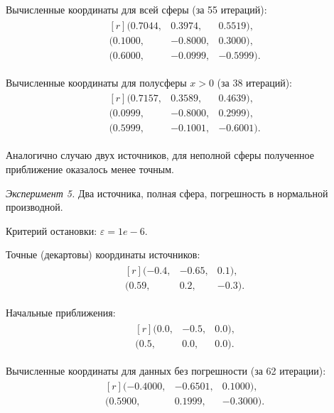 Вычисленные координаты для всей сферы (за 55 итераций):
\begin{align*}
    \begin{matrix*}[r]
    (0.7044, & 0.3974, & 0.5519) \text{,}\\
    (0.1000, & -0.8000, & 0.3000) \text{,}\\
    (0.6000, & -0.0999, & -0.5999) \text{.}
    \end{matrix*}
\end{align*}

Вычисленные координаты для полусферы $x > 0$ (за 38 итераций):
\begin{align*}
    \begin{matrix*}[r]
    (0.7157, & 0.3589, & 0.4639) \text{,}\\
    (0.0999, & -0.8000, & 0.2999) \text{,}\\
    (0.5999, & -0.1001, & -0.6001) \text{.}
    \end{matrix*}
\end{align*}

Аналогично случаю двух источников, для неполной сферы полученное приближение оказалось менее точным.

\emph{Эксперимент 5.} Два источника, полная сфера, погрешность в нормальной производной.

Критерий остановки: $\varepsilon = 1e-6$.

Точные (декартовы) координаты источников:
\begin{align*}
    \begin{matrix*}[r]
(-0.4, & -0.65, & 0.1) \text{,}\\
(0.59, & 0.2, & -0.3) \text{.}
    \end{matrix*}
\end{align*}

Начальные приближения:
\begin{align*}
    \begin{matrix*}[r]
(0.0, & -0.5, & 0.0) \text{,}\\
(0.5, & 0.0, & 0.0) \text{.}
    \end{matrix*}
\end{align*}

Вычисленные координаты для данных без погрешности (за 62 итерации):
\begin{align*}
    \begin{matrix*}[r]
(-0.4000, & -0.6501, & 0.1000) \text{,}\\
(0.5900, & 0.1999, & -0.3000) \text{.}
    \end{matrix*}
\end{align*}

